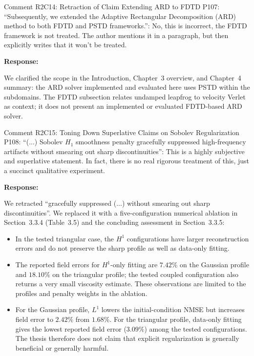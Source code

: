 \documentclass[11pt,a4paper]{article}
\newenvironment{response}{
    \par\vspace{1mm}\noindent\textbf{\textcolor{responseframe}{Response:}}\par\vspace{1mm}
}{
    \par\vspace{3mm}
}
\begin{document}
\begin{revcomment}{Comment R2C14: Retraction of Claim Extending ARD to FDTD}
P107: ``Subsequently, we extended the Adaptive Rectangular Decomposition (ARD) method to both FDTD and PSTD frameworks.'': No, this is incorrect, the FDTD framework is not treated. The author mentions it in a paragraph, but then explicitly writes that it won't be treated.
\end{revcomment}

\begin{response}
We clarified the scope in the Introduction, Chapter~3 overview, and Chapter~4 summary: the ARD solver implemented and evaluated here uses PSTD within the subdomains. The FDTD subsection relates undamped leapfrog to velocity Verlet as context; it does not present an implemented or evaluated FDTD-based ARD solver.
\end{response}

\begin{revcomment}{Comment R2C15: Toning Down Superlative Claims on Sobolev Regularization}
P108: ``(...) Sobolev $H_1$ smoothness penalty gracefully suppressed high-frequency artifacts without smearing out sharp discontinuities'': This is a highly subjective and superlative statement. In fact, there is no real rigorous treatment of this, just a succinct qualitative experiment.
\end{revcomment}

\begin{response}
We retracted ``gracefully suppressed (...) without smearing out sharp discontinuities''. We replaced it with a five-configuration numerical ablation in Section~3.3.4 (Table~3.5) and the concluding assessment in Section~3.3.5:
\begin{itemize}
    \item In the tested triangular case, the $H^1$ configurations have larger reconstruction errors and do not preserve the sharp profile as well as data-only fitting.
    \item The reported field errors for $H^1$-only fitting are $7.42\%$ on the Gaussian profile and $18.10\%$ on the triangular profile; the tested coupled configuration also returns a very small viscosity estimate. These observations are limited to the profiles and penalty weights in the ablation.
    \item For the Gaussian profile, $L^1$ lowers the initial-condition NMSE but increases field error to $2.42\%$ from $1.68\%$. For the triangular profile, data-only fitting gives the lowest reported field error ($3.09\%$) among the tested configurations. The thesis therefore does not claim that explicit regularization is generally beneficial or generally harmful.
\end{itemize}
\end{response}
\end{document}
